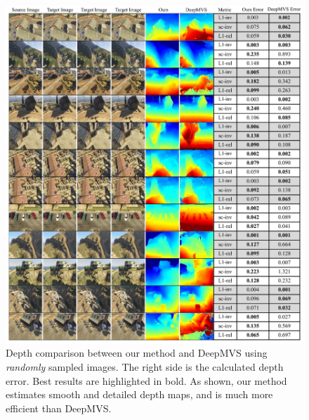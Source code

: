 \documentclass[letterpaper, 10 pt, conference]{ieeeconf}  %
\begin{document}
\begin{figure}[h]
\begin{center}
\includegraphics[width=1.0\linewidth]{figs/compare_mvs.pdf}
\end{center}   
\vspace{-0.5cm}
\caption{Depth comparison between our method and DeepMVS using \textit{randomly} sampled images. The right side is the calculated depth error. Best results are highlighted in bold. As shown, our method estimates smooth and detailed depth maps, and is much more efficient than DeepMVS.}
\label{fig:compare_mvs}
\end{figure}
 
\end{document}
